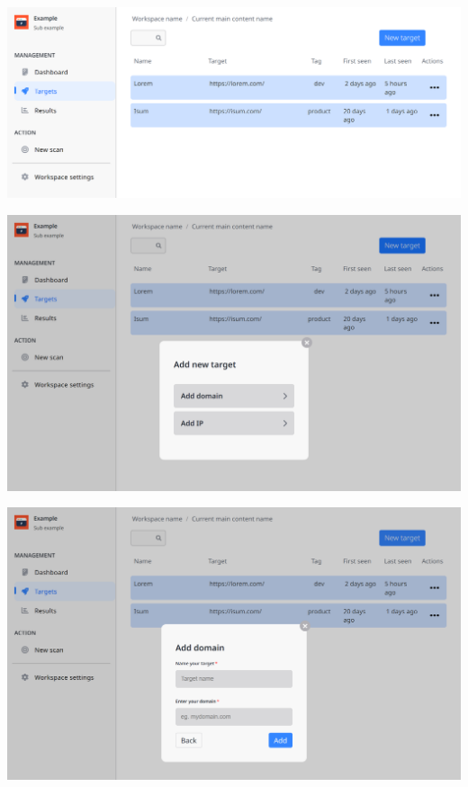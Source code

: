 \includegraphics[width=\textwidth]{images/prototype/prototype_22112022/dashboard_target.png}

\includegraphics[width=\textwidth]{images/prototype/prototype_22112022/dashboard_target_add target.png}

\vspace{2cm}

\includegraphics[width=\textwidth]{images/prototype/prototype_22112022/dashboard_target_add target_add domain.png}

